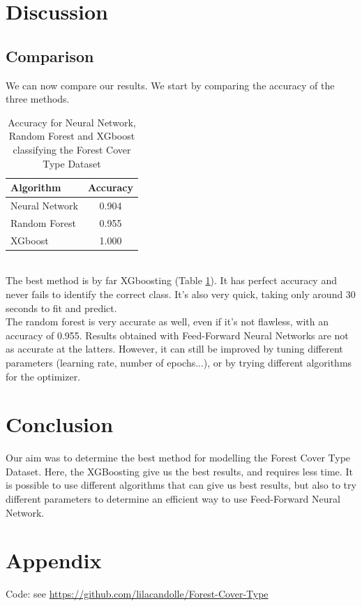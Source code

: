 \documentclass[letterpaper,12pt]{article}
\begin{document}
\section{Discussion}
\subsection{Comparison}
We can now compare our results.
We start by comparing the accuracy of the three methods.
\begin{table}[ht]
\centering
\label{tab:ml_comparison}
\begin{tabular}{|l|c|}
\toprule
Algorithm & Accuracy \\ \midrule
Neural Network     & 0.904         \\
Random Forest     & 0.955         \\
XGboost     & 1.000         \\ \bottomrule
\end{tabular}
\caption{Accuracy for Neural Network, Random Forest and XGboost classifying the Forest Cover Type Dataset}
\end{table}\\
The best method is by far XGboosting (Table \ref{tab:ml_comparison}). It has perfect accuracy and never fails to identify the correct class. It's also very quick, taking only around 30 seconds to fit and predict.\\
The random forest is very accurate as well, even if it's not flawless, with an accuracy of 0.955.
Results obtained with Feed-Forward Neural Networks are not as accurate at the latters. However, it can still be improved by tuning different parameters (learning rate, number of epochs...), or by trying different algorithms for the optimizer.

\newpage
\section{Conclusion}
Our aim was to determine the best method for modelling the Forest Cover Type Dataset. Here, the XGBoosting give us the best results, and requires less time. It is possible to use different algorithms that can give us best results, but also to try different parameters to determine an efficient way to use Feed-Forward Neural Network.

\newpage
\section{Appendix}
Code: see \url{https://github.com/lilacandolle/Forest-Cover-Type}
\newpage


\end{document}
